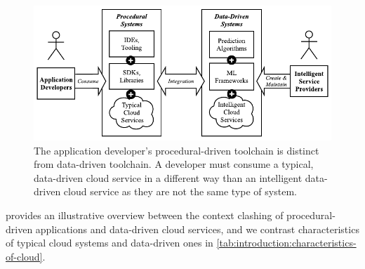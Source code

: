 



\begin{figure}
\centering
\includegraphics[width=0.95\linewidth]{rule-vs-data}
\caption[Differences between data- and procedural-driven cloud services]{The application developer's procedural-driven toolchain is distinct from data-driven toolchain. A developer must consume a typical, data-driven cloud service in a different way than an intelligent data-driven cloud service as they are not the same type of system.}
\label{fig:introduction:rule-vs-data}
\end{figure}

 provides an illustrative overview between the context clashing of procedural-driven applications and data-driven cloud services, and we contrast characteristics of typical cloud systems and data-driven ones in \cref{tab:introduction:characteristics-of-cloud}.


